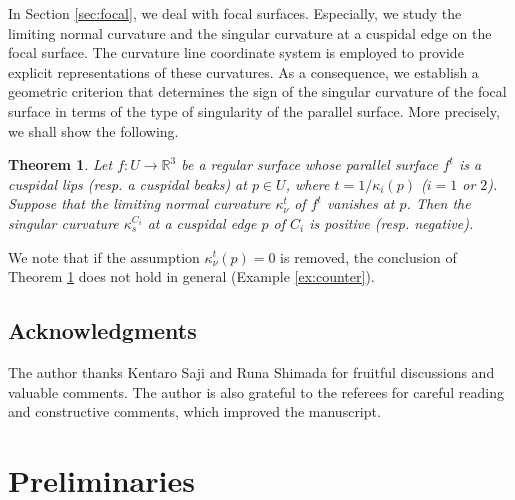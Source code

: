 \documentclass[11pt,a4paper,pdflatex,final]{amsart}
\theoremstyle{plain}
\newtheorem{theorem}{Theorem}[section]
\theoremstyle{definition}
\theoremstyle{remark}
\newcommand{\0}{\bm{0}}
\newcommand{\R}{\mathbb{R}}
\numberwithin{equation}{section}
\begin{document}
In Section \ref{sec:focal}, 
we deal with focal surfaces. 
Especially, we study the limiting normal curvature 
and the singular curvature at a cuspidal edge on the focal surface. 
The curvature line coordinate system is employed to provide explicit representations 
of these curvatures. 
As a consequence, we establish a geometric criterion that determines the sign of the singular curvature of the focal surface in terms of the type of singularity of the parallel surface. 
More precisely, we shall show the following.
\begin{theorem}\label{thm:ks-c1}
	Let $f\colon U\to\R^3$ be a regular surface 
	whose parallel surface $f^{t}$ is a cuspidal lips 
	\textup{(}resp. a cuspidal beaks\textup{)} at $p\in U$, 
	where $t=1/\kappa_i(p)$ \textup{(}$i=1$ or $2$\textup{)}. 
	Suppose that the limiting normal curvature $\kappa_\nu^t$ of $f^t$ 
	vanishes at $p$.  
	Then the singular curvature $\kappa_s^{C_i}$ at a cuspidal edge $p$ of $C_i$ 
	is positive \textup{(}resp. negative\textup{)}. 
\end{theorem}
We note that if the assumption {$\kappa_\nu^t(p)=0$} is removed, 
the conclusion of Theorem \ref{thm:ks-c1} does not hold in general 
(Example \ref{ex:counter}).

\subsection*{Acknowledgments} 
The author thanks Kentaro Saji and Runa Shimada 
for fruitful discussions and valuable comments. 
The author is also grateful to the referees for 
careful reading and constructive comments, which improved the manuscript. 

\section{Preliminaries}
\end{document}
